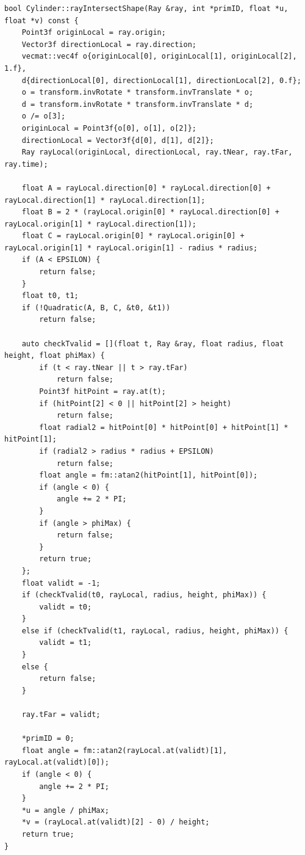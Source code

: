 \documentclass{article}
\begin{document}
\begin{lstlisting}[style=cppstyle]
bool Cylinder::rayIntersectShape(Ray &ray, int *primID, float *u, float *v) const {
    Point3f originLocal = ray.origin;
    Vector3f directionLocal = ray.direction;
    vecmat::vec4f o{originLocal[0], originLocal[1], originLocal[2], 1.f},
    d{directionLocal[0], directionLocal[1], directionLocal[2], 0.f};
    o = transform.invRotate * transform.invTranslate * o;
    d = transform.invRotate * transform.invTranslate * d;
    o /= o[3];
    originLocal = Point3f{o[0], o[1], o[2]};
    directionLocal = Vector3f{d[0], d[1], d[2]};
    Ray rayLocal(originLocal, directionLocal, ray.tNear, ray.tFar, ray.time);

    float A = rayLocal.direction[0] * rayLocal.direction[0] + rayLocal.direction[1] * rayLocal.direction[1];
    float B = 2 * (rayLocal.origin[0] * rayLocal.direction[0] + rayLocal.origin[1] * rayLocal.direction[1]);
    float C = rayLocal.origin[0] * rayLocal.origin[0] + rayLocal.origin[1] * rayLocal.origin[1] - radius * radius;
    if (A < EPSILON) {
        return false;
    }
    float t0, t1;
    if (!Quadratic(A, B, C, &t0, &t1))
        return false;

    auto checkTvalid = [](float t, Ray &ray, float radius, float height, float phiMax) {
        if (t < ray.tNear || t > ray.tFar)
            return false;
        Point3f hitPoint = ray.at(t);
        if (hitPoint[2] < 0 || hitPoint[2] > height)
            return false;
        float radial2 = hitPoint[0] * hitPoint[0] + hitPoint[1] * hitPoint[1];
        if (radial2 > radius * radius + EPSILON)
            return false;
        float angle = fm::atan2(hitPoint[1], hitPoint[0]);
        if (angle < 0) {
            angle += 2 * PI;
        }
        if (angle > phiMax) {
            return false;
        }
        return true;
    };
    float validt = -1;
    if (checkTvalid(t0, rayLocal, radius, height, phiMax)) {
        validt = t0;
    }
    else if (checkTvalid(t1, rayLocal, radius, height, phiMax)) {
        validt = t1;
    }
    else {
        return false;
    }

    ray.tFar = validt;

    *primID = 0;
    float angle = fm::atan2(rayLocal.at(validt)[1], rayLocal.at(validt)[0]);
    if (angle < 0) {
        angle += 2 * PI;
    }
    *u = angle / phiMax;
    *v = (rayLocal.at(validt)[2] - 0) / height;
    return true;
}
\end{lstlisting}
\end{document}
